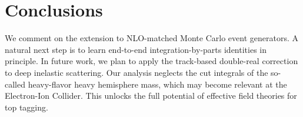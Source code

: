 \section{Conclusions}\label{sec:conclusions}

We comment on the extension to NLO-matched Monte Carlo event generators.
A natural next step is to learn end-to-end integration-by-parts
identities in principle. In future work, we plan to apply the
track-based double-real correction to deep inelastic scattering. Our
analysis neglects the cut integrals of the so-called heavy-flavor heavy
hemisphere mass, which may become relevant at the Electron-Ion Collider.
This unlocks the full potential of effective field theories for top
tagging.

